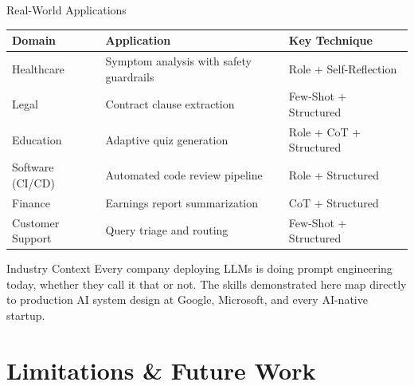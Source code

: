 \documentclass[aspectratio=169, 12pt]{beamer}
\begin{document}
\begin{frame}{Real-World Applications}
  \small
  \begin{tabular}{@{}lll@{}}
    \toprule
    \textbf{Domain}      & \textbf{Application}                    & \textbf{Key Technique} \\
    \midrule
    Healthcare           & Symptom analysis with safety guardrails & Role + Self-Reflection \\
    Legal                & Contract clause extraction              & Few-Shot + Structured \\
    Education            & Adaptive quiz generation                & Role + CoT + Structured \\
    Software (CI/CD)     & Automated code review pipeline          & Role + Structured \\
    Finance              & Earnings report summarization           & CoT + Structured \\
    Customer Support     & Query triage and routing                & Few-Shot + Structured \\
    \bottomrule
  \end{tabular}
  \vspace{0.8em}
  \begin{block}{Industry Context}
    Every company deploying LLMs is doing prompt engineering today, whether they
    call it that or not. The skills demonstrated here map directly to production
    AI system design at Google, Microsoft, and every AI-native startup.
  \end{block}
\end{frame}

\section{Limitations \& Future Work}
\end{document}
